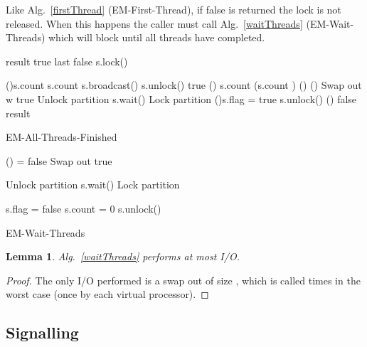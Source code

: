 \documentclass[12pt]{carletoncsthesis}
\newtheorem{lemma}[thm]{Lemma}
\begin{document}
Like Alg.~\ref{firstThread} ({\sc EM-First-Thread}), if false is returned
the lock is not released.  When this happens the caller must call
Alg.~\ref{waitThreads} ({\sc EM-Wait-Threads}) which will block until all
threads have completed.

\begin{algorithm}[h]
	\BlankLine
	result  true\;
	last  false\;
	s.lock()\;

	\If(){s.count }{
		s.count \;
		s.broadcast()\;
		s.unlock()\;
		\Return true\;
	}\Else(){
		s.count  (s.count )\;
		\If(){}{
			\If(){}{
				Swap out\;
				w  true\;
			}
			Unlock partition\;
			s.wait()\;
			Lock partition\;
		}
		\If(){s.flag = true}{
			s.unlock()\;
		}\Else(){
			\Return false\;
		}
	}
	\Return result\;
	\caption{\sc EM-All-Threads-Finished}
	\label{allThreadsFinished}
\end{algorithm}

\begin{algorithm}[h]
	\BlankLine
	\If(){ = false}{
		Swap out\;
		 true\;
	}
	
	\BlankLine
	Unlock partition\;
	s.wait()\;
	Lock partition\;

	\BlankLine
	s.flag = false\;
	s.count = 0\;
	s.unlock()\;
	\caption{\sc EM-Wait-Threads}
	\label{waitThreads}
\end{algorithm}

\begin{lemma}
\label{wait-threads-io}
Alg.~\ref{waitThreads} performs at most  I/O.
\end{lemma}
\begin{proof}
The only I/O performed is a swap out of size , which is called
 times in the worst case (once by each virtual processor).
\end{proof}

\subsection{Signalling}
\end{document}
